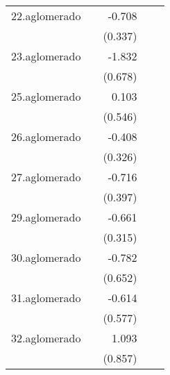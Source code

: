 {\begin{longtable}{l*{4}{D{.}{.}{-1}}}
\addlinespace
22.aglomerado&                     &      -0.708\sym{*}  &                     &                     \\
            &                     &     (0.337)         &                     &                     \\
\addlinespace
23.aglomerado&                     &      -1.832\sym{**} &                     &                     \\
            &                     &     (0.678)         &                     &                     \\
\addlinespace
25.aglomerado&                     &       0.103         &                     &                     \\
            &                     &     (0.546)         &                     &                     \\
\addlinespace
26.aglomerado&                     &      -0.408         &                     &                     \\
            &                     &     (0.326)         &                     &                     \\
\addlinespace
27.aglomerado&                     &      -0.716         &                     &                     \\
            &                     &     (0.397)         &                     &                     \\
\addlinespace
29.aglomerado&                     &      -0.661\sym{*}  &                     &                     \\
            &                     &     (0.315)         &                     &                     \\
\addlinespace
30.aglomerado&                     &      -0.782         &                     &                     \\
            &                     &     (0.652)         &                     &                     \\
\addlinespace
31.aglomerado&                     &      -0.614         &                     &                     \\
            &                     &     (0.577)         &                     &                     \\
\addlinespace
32.aglomerado&                     &       1.093         &                     &                     \\
            &                     &     (0.857)         &                     &                     \\

\end{longtable}}
